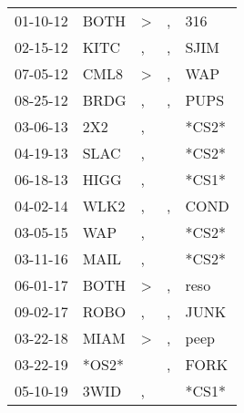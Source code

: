 \begin{supertabular}{p{0.07\textwidth}p{0.06\textwidth}p{0.02\textwidth}p{0.02\textwidth}p{0.06\textwidth}}
 01-10-12\textsuperscript{} &           BOTH\textsuperscript{} &  \textgreater &  , &   316\textsuperscript{} \\
 02-15-12\textsuperscript{} &           KITC\textsuperscript{} &             , &  , &  SJIM\textsuperscript{} \\
 07-05-12\textsuperscript{} &           CML8\textsuperscript{} &  \textgreater &  , &   WAP\textsuperscript{} \\
 08-25-12\textsuperscript{} &           BRDG\textsuperscript{} &             , &  , &  PUPS\textsuperscript{} \\
 03-06-13\textsuperscript{} &            2X2\textsuperscript{} &             , &    &                   *CS2* \\
 04-19-13\textsuperscript{} &           SLAC\textsuperscript{} &             , &    &                   *CS2* \\
 06-18-13\textsuperscript{} &           HIGG\textsuperscript{} &             , &    &                   *CS1* \\
 04-02-14\textsuperscript{} &           WLK2\textsuperscript{} &             , &  , &  COND\textsuperscript{} \\
 03-05-15\textsuperscript{} &            WAP\textsuperscript{} &             , &    &                   *CS2* \\
 03-11-16\textsuperscript{} &           MAIL\textsuperscript{} &             , &    &                   *CS2* \\
 06-01-17\textsuperscript{} &           BOTH\textsuperscript{} &  \textgreater &  , &  reso\textsuperscript{} \\
 09-02-17\textsuperscript{} &           ROBO\textsuperscript{} &             , &  , &  JUNK\textsuperscript{} \\
 03-22-18\textsuperscript{} &           MIAM\textsuperscript{} &  \textgreater &  , &  peep\textsuperscript{} \\
 03-22-19\textsuperscript{} &                            *OS2* &               &  , &  FORK\textsuperscript{} \\
 05-10-19\textsuperscript{} &           3WID\textsuperscript{} &             , &    &                   *CS1* \\
\end{supertabular}
